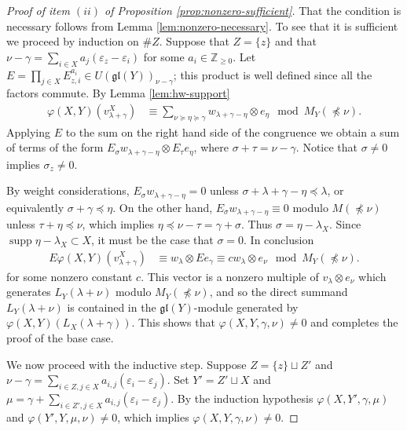 \documentclass[11pt,fleqn]{amsart}
\newcommand\ZZ{\mathbb Z}
\renewcommand\phi{\varphi}
\renewcommand\epsilon{\varepsilon}
\theoremstyle{definition}
\theoremstyle{remark}
\theoremstyle{remark}
\newcommand\gl{\mathfrak{gl}}
\DeclareMathOperator\supp{supp}
\newcommand\map[4]{\phi(#3,#4,#1,#2)}
\begin{document}
\begin{proof}[Proof of item $(ii)$ of Proposition \ref{prop:nonzero-sufficient}]
That the condition is necessary follows from Lemma \ref{lem:nonzero-necessary}. 
To see that it is sufficient we proceed by induction on $\#Z$. Suppose that $Z =
\{z\}$ and that $\nu - \gamma = \sum_{i \in X} a_j (\epsilon_z - \epsilon_i)$ 
for some $a_i \in \ZZ_{\geq 0}$. Let $E = \prod_{j \in X} E_{z,i}^{a_i} \in 
U(\gl(Y))_{\nu - \gamma}$; this product is well defined since all the factors 
commute. By Lemma \ref{lem:hw-support}
\begin{align*}
  \phi(X,Y)(v_{\lambda +\gamma}^X) 
    &\equiv \sum_{\nu \succeq \eta \succeq \gamma} 
      w_{\lambda + \gamma - \eta} \otimes e_{\eta}
      \mod M_Y(\npreceq \nu).
\end{align*}
Applying $E$ to the sum on the right hand side of the congruence we obtain a 
sum of terms of the form $E_{\sigma} w_{\lambda + \gamma - \eta} \otimes 
E_{\tau} e_{\eta}$, where $\sigma + \tau = \nu - \gamma$. Notice that $\sigma 
\neq 0$ implies $\sigma_z \neq 0$.

By weight considerations, $E_{\sigma} w_{\lambda + \gamma - \eta} = 0$ unless 
$\sigma + \lambda + \gamma - \eta \preceq \lambda$, or equivalently $ \sigma + 
\gamma \preceq  \eta$. On the other hand, $E_{\sigma} w_{\lambda + \gamma - 
\eta} \equiv 0$ modulo $M(\npreceq \nu)$ unless $\tau + \eta \preceq \nu$, 
which implies $\eta \preceq \nu - \tau = \gamma + \sigma$. Thus $\sigma = \eta 
- \lambda_X$. Since $\supp \eta - \lambda_X \subset X$, it must be the case 
that $\sigma = 0$. In conclusion
\begin{align*}
  E \phi(X,Y)(v_{\lambda +\gamma}^X) 
    &\equiv w_{\lambda } \otimes E e_{\gamma}
    \equiv c w_{\lambda} \otimes e_{\nu}
      \mod M_Y(\npreceq \nu).
\end{align*}
for some nonzero constant $c$. This vector is a nonzero multiple of 
$v_{\lambda} \otimes e_{\nu}$ which generates $L_Y(\lambda + \nu)$
modulo $M_Y(\npreceq \nu)$, and so the direct summand $L_Y(\lambda + \nu)$ is 
contained in the $\gl(Y)$-module generated by $\phi(X,Y)(L_X(\lambda + \gamma)
)$. This shows that $\phi(X,Y,\gamma,\nu) \neq 0$ and completes the proof of 
the base case.

We now proceed with the inductive step. Suppose $Z = \{z\} \sqcup Z'$ and 
$\nu - \gamma = \sum_{i \in Z, j \in X} a_{i,j} (\epsilon_i - \epsilon_j)$. 
Set $Y' = Z' \sqcup X$ and $\mu = \gamma + \sum_{i \in Z', j \in X} a_{i,j} 
(\epsilon_i - \epsilon_j)$. By the induction hypothesis 
$\map{\gamma}{\mu}{X}{Y'}$ and $\map{\mu}{\nu}{Y'}{Y} \neq 0$, 
which implies $\map{\gamma}{\nu}{X}{Y} \neq 0$. 
\end{proof}
\end{document}
